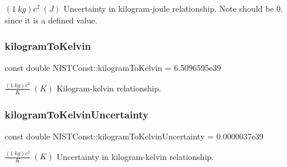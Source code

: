$(1\ kg)c^2 \ (J)$ Uncertainty in kilogram-\/joule relationship. Note should be 0. since it is a defined value. \mbox{\label{group___n_i_s_t_const-_kilogram_ga79d71b550888761f76eaca5ffc4a29cb}} 
\subsubsection{\texorpdfstring{kilogram\+To\+Kelvin}{kilogramToKelvin}}
{\footnotesize\ttfamily const double N\+I\+S\+T\+Const\+::kilogram\+To\+Kelvin = 6.\+5096595e39}

$\frac{(1\ kg)c^2}{K} \ (K)$ Kilogram-\/kelvin relationship. \mbox{\label{group___n_i_s_t_const-_kilogram_ga744389701b8d90c75aa01618867ed42e}} 
\subsubsection{\texorpdfstring{kilogram\+To\+Kelvin\+Uncertainty}{kilogramToKelvinUncertainty}}
{\footnotesize\ttfamily const double N\+I\+S\+T\+Const\+::kilogram\+To\+Kelvin\+Uncertainty = 0.\+0000037e39}

$\frac{(1\ kg)c^2}{K} \ (K)$ Uncertainty in kilogram-\/kelvin relationship. 